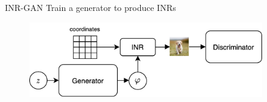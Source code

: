 \documentclass[10pt]{beamer}
\begin{document}
\begin{frame}{INR-GAN}
Train a generator to produce INRs
    \begin{figure}
        \centering
        \includegraphics[width=0.9\textwidth]{images/inr-gan}
    \end{figure}
\end{frame}
\end{document}
